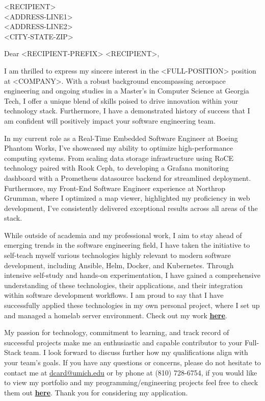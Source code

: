 \large
\bigskip\begin{minipage}[h]{\linewidth}
    \begin{raggedright}
        <RECIPIENT>\\
        <ADDRESS-LINE1>\\
        <ADDRESS-LINE2>\\
        <CITY-STATE-ZIP>\\
    \end{raggedright}
\end{minipage}

\bigskip Dear <RECIPIENT-PREFIX> <RECIPIENT>,

\medskip I am thrilled to express my sincere interest in the <FULL-POSITION> position at <COMPANY>. With a robust background encompassing aerospace engineering and ongoing studies in a Master's in Computer Science at Georgia Tech, I offer a unique blend of skills poised to drive innovation within your technology stack. Furthermore, I have a demonstrated history of success that I am confident will positively impact your software engineering team.

\medskip In my current role as a Real-Time Embedded Software Engineer at Boeing Phantom Works, I've showcased my ability to optimize high-performance computing systems. From scaling data storage infrastructure using RoCE technology paired with Rook Ceph, to developing a Grafana monitoring dashboard with a Prometheus datasource backend for streamlined deployment. Furthermore, my Front-End Software Engineer experience at Northrop Grumman, where I optimized a map viewer, highlighted my proficiency in web development, I've consistently delivered exceptional results across all areas of the stack.

\medskip While outside of academia and my professional work, I aim to stay ahead of emerging trends in the software engineering field, I have taken the initiative to self-teach myself various technologies highly relevant to modern software development, including Ansible, Helm, Docker, and Kubernetes. Through intensive self-study and hands-on experimentation, I have gained a comprehensive understanding of these technologies, their applications, and their integration within software development workflows. I am proud to say that I have successfully applied these technologies in my own personal project, where I set up and managed a homelab server environment. Check out my work \href{https://github.com/dancard32/homelab}{\textbf{\underline{here}}}.

\medskip My passion for technology, commitment to learning, and track record of successful projects make me an enthusiastic and capable contributor to your Full-Stack team. I look forward to discuss further how my qualifications align with your team's goals. If you have any questions or concerns, please do not hesitate to  contact me at \href{mailto:dcard@umich.edu}{dcard@umich.edu} or by phone at (810) 728-6754, if you would like to view my portfolio and my programming/engineering projects feel free to check them out \href{https://dancard32.github.io/website/#/projects}{\textbf{\underline{here}}}. Thank you for considering my application.

